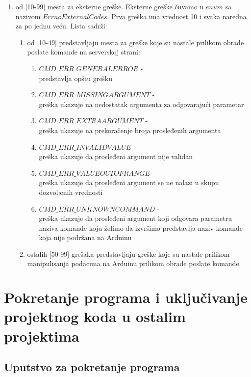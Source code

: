 \documentclass[a4paper]{extarticle}
\begin{document}
\begin{enumerate}
\begin{enumerate}
		\end{enumerate}
		\item od [10-99] mesta za eksterne greške. Eksterne greške čuvamo u $enum$ sa nazivom $ErrnoExternalCodes$. Prva greška ima vrednost 10 i svaka naredna za po jednu veću. Lista sadrži:
		\begin{enumerate}
			\item od [10-49] predstavljaju mesta za greške koje su nastale prilikom obrade poslate komande na serverskoj strani:
			\begin{enumerate}
				\item $CMD\_ERR\_GENERALERROR$ - \\predstavlja opštu grešku
				\item $CMD\_ERR\_MISSINGARGUMENT$ -\\ greška ukazuje na nedostatak argumenta za odgovarajući parametar
				\item $CMD\_ERR\_EXTRAARGUMENT$ -\\  greška ukazuje na prekoračenje broja prosleđenih argumenta
				\item $CMD\_ERR\_INVALIDVALUE$ -\\  greška ukazuje da prosleđeni argument nije validan
				\item $CMD\_ERR\_VALUEOUTOFRANGE$ -\\  greška ukazuje da prosleđeni argument se ne nalazi u skupu dozvoljenih vrednosti
				\item $CMD\_ERR\_UNKNOWNCOMMAND$ -\\  greška ukazuje da prosleđeni argument koji odgovara parametru naziva komande koju želimo da izvršimo predstavlja naziv komande koja nije podržana na Arduinu
				
			\end{enumerate}
			\item ostalih [50-99] grešaka predstavljaju greške koje su nastale prilikom manipulisanja podacima na Arduinu prilikom obrade poslate komande.
		\end{enumerate} 
	\end{enumerate}
	
	\section{Pokretanje programa i uključivanje projektnog koda u ostalim projektima}

\subsection{Uputstvo za pokretanje programa}
\end{document}
